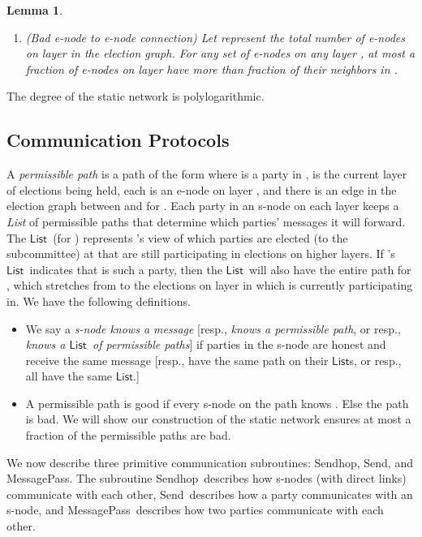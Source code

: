 \documentclass[11pt,letter]{article}
\theoremstyle{mytheoremstyle}
\newtheorem{lemma}{Lemma}
\newcommand{\Sendhop}{\textsf{Sendhop}}
\newcommand{\Send}{\textsf{Send}}
\newcommand{\MessagePass}{\textsf{MessagePass}}
\newcommand{\lst}{\ensuremath{\mathsf{List}}}
\begin{document}
\begin{description}
{\begin{lemma}
\begin{enumerate}
		\item  (Bad \textsf{e-node} to \textsf{e-node} connection) Let  represent the total number of \textsf{e-node}s on layer  in the election graph.
For any set  of \textsf{e-node}s on any layer ,  at most a  fraction of \textsf{e-node}s on layer  have more than  fraction of their neighbors in .
		
	\end{enumerate}
\end{lemma}

The degree of the static network is polylogarithmic.

\subsection{Communication Protocols} \label{s:low level communication}

A {\em permissible path} is a path of the form  where  is a party in ,  is the current layer of elections being held, each  is an \textsf{e-node} on layer , and there is an edge in the election graph between  and  for . Each party  in an \textsf{s-node}  on each layer  keeps a {\em List} of permissible paths that determine which parties' messages it will forward. The \lst\ (for ) represents 's view of which parties are elected (to the subcommittee) at  that are still participating in elections on higher layers. If 's \lst\ indicates that  is such a party, then the \lst\ will also have the entire path for , which stretches from  to the elections on layer  in which  is currently participating in. We have the following definitions.

\begin{itemize}
	\item We say a {\em \textsf{s-node} knows a message} [resp., {\em knows a permissible path}, or resp., {\em knows a \lst\ of permissible paths}] if  parties in the \textsf{s-node} are honest and receive the same message [resp., have the same path on their \lst s, or resp., all have the same \lst.]
	
	\item A permissible path  is good if every \textsf{s-node} on the path knows . Else the path is bad. We will show our construction of the static network ensures at most a  fraction of the permissible paths are bad.
\end{itemize}

We now describe three primitive communication subroutines: \Sendhop, \Send, and \MessagePass. The subroutine \Sendhop\ describes how \textsf{s-node}s (with direct links) communicate with each other, \Send\ describes how a party communicates with an \textsf{s-node}, and \MessagePass\ describes how two parties communicate with each other.

}
\end{description}
\end{document}
